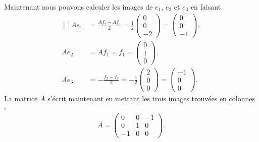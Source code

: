 Maintenant nous pouvons calculer les images de \( e_1\), \( e_2\) et \( e_3\) en faisant
\begin{equation}
	\begin{aligned}[]
		Ae_1 & =\frac{ Af_2-Af_3 }{ 2 }=\frac{1 }{2}\begin{pmatrix}
			                                            0 \\
			                                            0 \\
			                                            -2
		                                            \end{pmatrix}=\begin{pmatrix}
			                                                          0 \\
			                                                          0 \\
			                                                          -1
		                                                          \end{pmatrix},  \\
		Ae_2 & =Af_1=f_1=\begin{pmatrix}
			                 0 \\
			                 1 \\
			                 0
		                 \end{pmatrix},                                           \\
		Ae_3 & =-\frac{ f_2-f_3 }{ 2 }=-\frac{ 1 }{2}\begin{pmatrix}
			                                             2 \\
			                                             0 \\
			                                             0
		                                             \end{pmatrix}=\begin{pmatrix}
			                                                           -1 \\
			                                                           0  \\
			                                                           0
		                                                           \end{pmatrix}.
	\end{aligned}
\end{equation}
La matrice \( A\) s'écrit maintenant en mettant les trois images trouvées en colonnes :
\begin{equation}
	A=\begin{pmatrix}
		0  & 0 & -1 \\
		0  & 1 & 0  \\
		-1 & 0 & 0
	\end{pmatrix}.
\end{equation}

